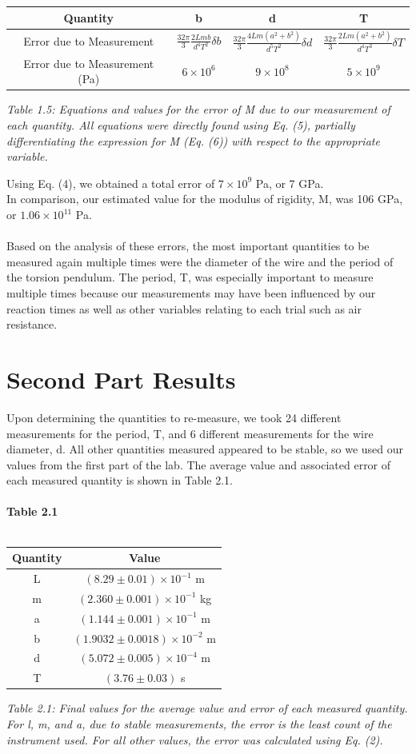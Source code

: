 \documentclass[leqno]{article}
\begin{document}
\begin{tabular}{|c|c|c|c|}
\hline
Quantity & b & d & T\\
\hline
Error due to Measurement & $\frac{32\pi}{3}\frac{2Lmb}{d^4 T^2}\delta b$ & $\frac{32\pi}{3}\frac{4Lm(a^2+b^2)}{d^5 T^2}\delta d$ & $\frac{32\pi}{3}\frac{2Lm(a^2+b^2)}{d^4 T^3}\delta T$\\
\hline
Error due to Measurement (Pa)& $6\times10^6$ & $9\times10^8$ & $5\times10^9$\\
\hline
\end{tabular}
\begin{flushleft}
\textit{\small Table 1.5: Equations and values for the error of M due to our measurement of each quantity.  All equations were directly found using Eq. (5), partially differentiating the expression for M (Eq. (6)) with respect to the appropriate variable.}
\end{flushleft}
Using Eq. (4), we obtained a total error of $7 \times 10^9$ Pa, or 7 GPa.\\
In comparison, our estimated value for the modulus of rigidity, M, was 106 GPa, or $1.06\times10^{11}$ Pa.\\\\
Based on the analysis of these errors, the most important quantities to be measured again multiple times were the diameter of the wire and the period of the torsion pendulum.  The period, T, was especially important to measure multiple times because our measurements may have been influenced by our reaction times as well as other variables relating to each trial such as air resistance.
\section*{Second Part Results}
Upon determining the quantities to re-measure, we took 24 different measurements for the period, T, and 6 different measurements for the wire diameter, d.  All other quantities measured appeared to be stable, so we used our values from the first part of the lab.  The average value  and associated error of each measured quantity is shown in Table 2.1.\\\\
\textbf{Table 2.1}\\\\
\begin{tabular}{c|c}
	Quantity & Value\\
	\hline
	L & $(8.29\pm0.01)\times 10^{-1}$ m\\
	m & $(2.360\pm0.001)\times 10^{-1}$ kg\\
	a & $(1.144\pm0.001)\times 10^{-1}$ m\\
	b & $(1.9032\pm0.0018)\times10^{-2}$ m\\
	d & $(5.072\pm0.005)\times 10^{-4}$ m\\
	T & $(3.76\pm0.03)$ s\\
\end{tabular}
\begin{flushleft}
\textit{\small Table 2.1: Final values for the average value and error of each measured quantity.  For l, m, and a, due to stable measurements, the error is the least count of the instrument used.  For all other values, the error was calculated using Eq. (2).}
\end{flushleft}
\end{document}
